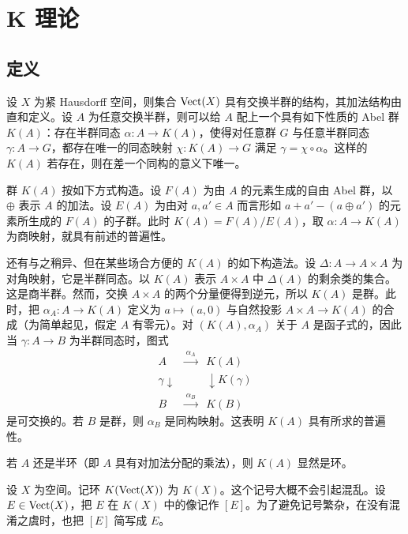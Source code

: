 \chapter{K 理论}
\section{定义}

设 $X$ 为紧 Hausdorff 空间，则集合 $\operatorname{Vect}(X)$ 具有交换半群的结构，其加法结构由直和定义。设 $A$ 为任意交换半群，则可以给 $A$ 配上一个具有如下性质的 Abel 群 $K(A)$：存在半群同态 $\alpha\colon A\to K(A)$，使得对任意群 $G$ 与任意半群同态 $\gamma\colon A\to G$，都存在唯一的同态映射 $\chi\colon K(A)\to G$ 满足 $\gamma=\chi\circ\alpha$。这样的 $K(A)$ 若存在，则在差一个同构的意义下唯一。

群 $K(A)$ 按如下方式构造。设 $F(A)$ 为由 $A$ 的元素生成的自由 Abel 群，以 $\oplus$ 表示 $A$ 的加法。设 $E(A)$ 为由对 $a,a'\in A$ 而言形如 $a+a'-(a\oplus a')$ 的元素所生成的 $F(A)$ 的子群。此时 $K(A)=F(A)/E(A)$，取 $\alpha\colon A\to K(A)$ 为商映射，就具有前述的普遍性。

还有与之稍异、但在某些场合方便的 $K(A)$ 的如下构造法。设 $\Delta\colon A\to A\times A$ 为对角映射，它是半群同态。以 $K(A)$ 表示 $A\times A$ 中 $\Delta(A)$ 的剩余类的集合。这是商半群。然而，交换 $A\times A$ 的两个分量便得到逆元，所以 $K(A)$ 是群。此时，把 $\alpha_A\colon A\to K(A)$ 定义为 $a\mapsto(a,0)$ 与自然投影 $A\times A\to K(A)$ 的合成（为简单起见，假定 $A$ 有零元）。对 $(K(A),\alpha_A)$ 关于 $A$ 是函子式的，因此当 $\gamma\colon A\to B$ 为半群同态时，图式
\[
\begin{array}{ccc}
A & \xrightarrow{\ \alpha_A\ } & K(A)\\
{\scriptstyle\gamma}\downarrow & & \downarrow{\scriptstyle K(\gamma)}\\
B & \xrightarrow{\ \alpha_B\ } & K(B)
\end{array}
\]
是可交换的。若 $B$ 是群，则 $\alpha_B$ 是同构映射。这表明 $K(A)$ 具有所求的普遍性。

若 $A$ 还是半环（即 $A$ 具有对加法分配的乘法），则 $K(A)$ 显然是环。

设 $X$ 为空间。记环 $K(\operatorname{Vect}(X))$ 为 $K(X)$。这个记号大概不会引起混乱。设 $E\in\operatorname{Vect}(X)$，把 $E$ 在 $K(X)$ 中的像记作 $[E]$。为了避免记号繁杂，在没有混淆之虞时，也把 $[E]$ 简写成 $E$。


